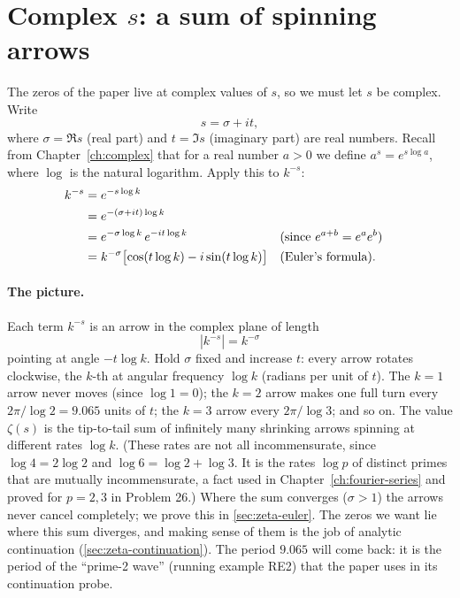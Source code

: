 \section{Complex $s$: a sum of spinning arrows}\label{sec:zeta-complex}

The zeros of the paper live at complex values of $s$, so we must let $s$ be complex. Write
\[
s=\sigma+it,
\]
where $\sigma=\Re s$ (real part) and $t=\Im s$ (imaginary part) are real numbers. Recall from Chapter~\ref{ch:complex} that for a real number $a>0$ we define $a^s=e^{s\log a}$, where $\log$ is the natural logarithm. Apply this to $k^{-s}$:
\begin{align}
k^{-s}&=e^{-s\log k} \notag\\
&=e^{-(\sigma+it)\log k}\notag\\
&=e^{-\sigma\log k}\,e^{-it\log k} &&\text{(since $e^{a+b}=e^ae^b$)}\notag\\
&=k^{-\sigma}\bigl[\cos(t\log k)-i\sin(t\log k)\bigr] &&\text{(Euler's formula)}.
\label{eq:zeta-term}
\end{align}

\paragraph{The picture.} Each term $k^{-s}$ is an arrow in the complex plane of length
\[
|k^{-s}|=k^{-\sigma}
\]
pointing at angle $-t\log k$. Hold $\sigma$ fixed and increase $t$: every arrow rotates clockwise, the $k$-th at angular frequency $\log k$ (radians per unit of $t$). The $k=1$ arrow never moves (since $\log1=0$); the $k=2$ arrow makes one full turn every $2\pi/\log2=9.065$ units of $t$; the $k=3$ arrow every $2\pi/\log3$; and so on. The value $\zeta(s)$ is the tip-to-tail sum of infinitely many shrinking arrows spinning at different rates $\log k$. (These rates are not all incommensurate, since $\log4=2\log2$ and $\log6=\log2+\log3$. It is the rates $\log p$ of distinct primes that are mutually incommensurate, a fact used in Chapter~\ref{ch:fourier-series} and proved for $p=2,3$ in Problem 26.) Where the sum converges ($\sigma>1$) the arrows never cancel completely; we prove this in \cref{sec:zeta-euler}. The zeros we want lie where this sum diverges, and making sense of them is the job of analytic continuation (\cref{sec:zeta-continuation}). The period $9.065$ will come back: it is the period of the ``prime-2 wave'' (running example RE2) that the paper uses in its continuation probe.


